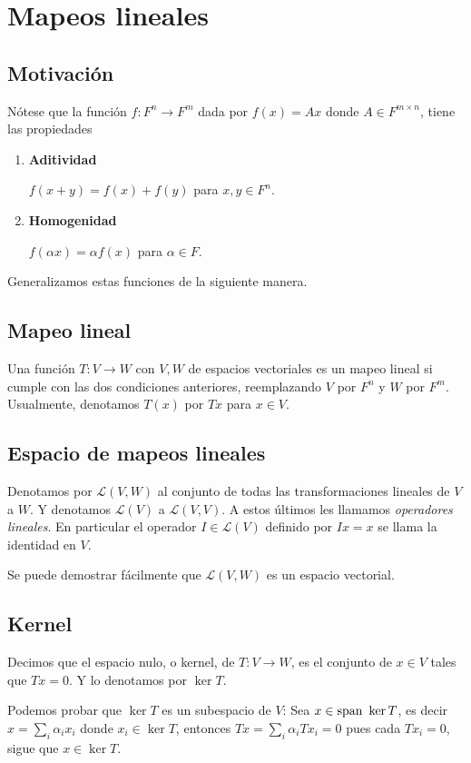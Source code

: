 \documentclass{article}
\begin{document}
\section{Mapeos lineales}
\subsection{Motivación}
Nótese que la función $f: F^n \rightarrow F^m$ dada por
$f(x) = Ax$ donde $A\in F^{m\times n}$, tiene las propiedades
\begin{enumerate}
    \item \textbf{Aditividad}

    $f(x+y) = f(x) + f(y)$ para $x,y\in F^n$.

    \item \textbf{Homogenidad}

    $f(\alpha x) = \alpha f(x)$ para $\alpha\in F$.
\end{enumerate}
Generalizamos estas funciones de la siguiente manera.

\subsection{Mapeo lineal}
Una función $T: V\rightarrow W$ con $V,W$ de espacios vectoriales es
un mapeo lineal si cumple con las dos condiciones anteriores, reemplazando $V$ por $F^n$ y $W$ por $F^m$. Usualmente,
denotamos $T(x)$ por $Tx$ para $x\in V$.

\subsection{Espacio de mapeos lineales}
Denotamos por $\mathcal{L}(V,W)$ al conjunto de todas
las transformaciones lineales de $V$ a $W$.
Y denotamos $\mathcal{L}(V)$ a $\mathcal{L}(V, V)$. A estos últimos
les llamamos \textit{operadores lineales}. En particular el operador
$I\in\mathcal{L}(V)$ definido por $Ix=x$ se llama la identidad en $V$.

Se puede demostrar fácilmente que $\mathcal{L}(V,W)$ es un espacio vectorial.

\subsection{Kernel}
Decimos que el espacio nulo, o kernel, de $T: V \rightarrow W$, es el conjunto de $x\in V$ tales que $Tx=0$. Y lo denotamos por
$\ker T$.

Podemos probar que $\ker T$ es un subespacio de $V$:
Sea $x \in \text{span } \ker T$, es decir $x = \sum_i \alpha_i x_i$ donde
$x_i\in \ker T$, entonces $Tx = \sum_i \alpha_i Tx_i = 0$ pues
cada $Tx_i=0$, sigue que $x\in\ker T$.
\end{document}
